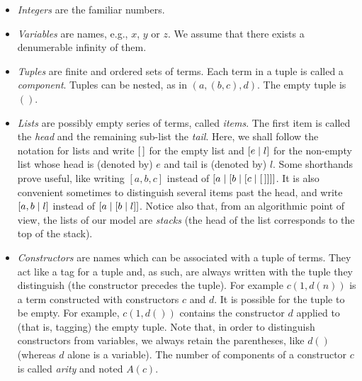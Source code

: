 \begin{itemize}

  \item \emph{Integers} are the familiar numbers.

  \item \emph{Variables} are names, e.g., \(x\), \(y\) or \(z\). We
    assume that there exists a denumerable infinity of them.

  \item \emph{Tuples} are finite and ordered sets of terms.  Each term
    in a tuple is called a \emph{component}. Tuples can be nested, as
    in \((a, (b, c), d)\).  The empty tuple is \(()\).

  \item \emph{Lists} are possibly empty series of terms, called
    \emph{items}. The first item is called the \emph{head} and the
    remaining sub\hyp{}list the \emph{tail}. Here, we shall follow the
    \Prolog notation for lists and write \([\,]\) for the empty list
    and \([{e}\mid{l}]\) for the non\hyp{}empty list whose head is
    (denoted by) \(e\) and tail is (denoted by) \(l\). Some shorthands
    prove useful, like writing \([a, b, c]\) instead of
    \([{a}\mid{[{b}\mid{[{c}\mid{[\,]}]}]}]\). It is also convenient
    sometimes to distinguish several items past the head, and write
    \([{a, b}\mid{l}]\) instead of \([{a}\mid{[{b}\mid{l}]}]\).  Notice
    also that, from an algorithmic point of view, the lists of our
    model are \emph{stacks} (the head of the list corresponds to the
    top of the stack).

  \item \emph{Constructors} are names which can be associated with a
    tuple of terms. They act like a tag for a tuple and, as such, are
    always written with the tuple they distinguish (the constructor
    precedes the tuple).  For example \(c(1, d(n))\) is a term
    constructed with constructors \(c\) and \(d\). It is possible for
    the tuple to be empty. 
    For example, \(c(1, d())\) contains the
    constructor \(d\) applied to (that is, tagging) the empty tuple.
    Note that, in order to distinguish constructors from variables, we
    always retain the parentheses, like \(d()\) (whereas \(d\) alone
    is a variable). The number of components of a constructor \(c\) is
    called \emph{arity} and noted \(A(c)\).


\end{itemize}
